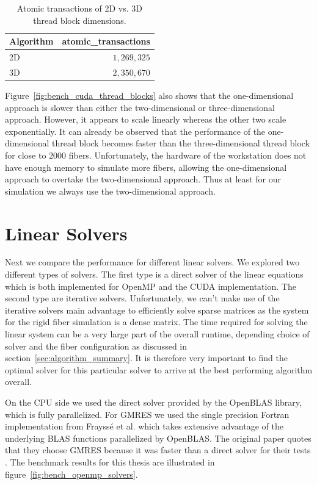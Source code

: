 \documentclass[a4paper,11pt]{kth-mag}
\begin{document}
\begin{table}[!htbp]
  \begin{center}
    \begin{tabulary}{0.7\textwidth}{LR}
      \toprule
      Algorithm & atomic\_transactions \\
      \midrule
      2D & $1,269,325$ \\
      3D & $2,350,670$ \\
      \bottomrule
    \end{tabulary}
  \end{center}
  \caption{Atomic transactions of 2D vs. 3D thread block dimensions.}
  \label{tab:atomic_transactions}
\end{table}

Figure~\ref{fig:bench_cuda_thread_blocks} also shows that the one-dimensional approach is slower than either the two-dimensional or three-dimensional approach. However, it appears to scale linearly whereas the other two scale exponentially. It can already be observed that the performance of the one-dimensional thread block becomes faster than the three-dimensional thread block for close to $2000$ fibers. Unfortunately, the hardware of the workstation does not have enough memory to simulate more fibers, allowing the one-dimensional approach to overtake the two-dimensional approach. Thus at least for our simulation we always use the two-dimensional approach.

\section{Linear Solvers}
\label{sec:bench_linear_solvers}

Next we compare the performance for different linear solvers. We explored two different types of solvers. The first type is a direct solver of the linear equations which is both implemented for OpenMP and the CUDA implementation. The second type are iterative solvers. Unfortunately, we can't make use of the iterative solvers main advantage to efficiently solve sparse matrices as the system for the rigid fiber simulation is a dense matrix. The time required for solving the linear system can be a very large part of the overall runtime, depending choice of solver and the fiber configuration as discussed in section~\ref{sec:algorithm_summary}. It is therefore very important to find the optimal solver for this particular solver to arrive at the best performing algorithm overall.

On the CPU side we used the direct solver provided by the OpenBLAS library, which is fully parallelized. For GMRES we used the single precision Fortran implementation from Frayssé et al. \cite{Fraysse2003} which takes extensive advantage of the underlying BLAS functions parallelized by OpenBLAS. The original paper quotes that they choose GMRES because it was faster than a direct solver for their tests \cite{Tornberg2006}. The benchmark results for this thesis are illustrated in figure~\ref{fig:bench_openmp_solvers}.
\end{document}
